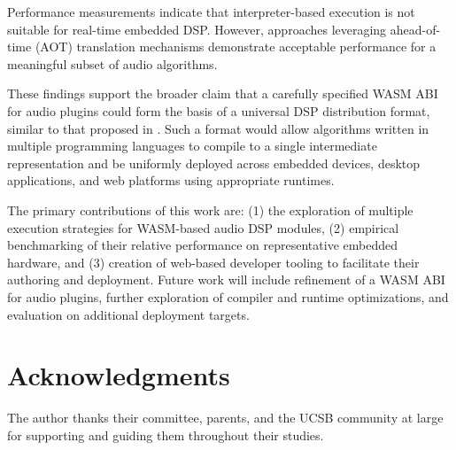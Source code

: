\documentclass[a4paper]{article}
\begin{document}
Performance measurements indicate that interpreter-based execution is not suitable for real-time embedded DSP. However, approaches leveraging ahead-of-time (AOT) translation mechanisms demonstrate acceptable performance for a meaningful subset of audio algorithms. 

These findings support the broader claim that a carefully specified WASM ABI for audio plugins could form the basis of a universal DSP distribution format, similar to that proposed in \cite{gaster2020audio}. Such a format would allow algorithms written in multiple programming languages to compile to a single intermediate representation and be uniformly deployed across embedded devices, desktop applications, and web platforms using appropriate runtimes.

The primary contributions of this work are: (1) the exploration of multiple execution strategies for WASM-based audio DSP modules, (2) empirical benchmarking of their relative performance on representative embedded hardware, and (3) creation of web-based developer tooling to facilitate their authoring and deployment. Future work will include refinement of a WASM ABI for audio plugins, further exploration of compiler and runtime optimizations, and evaluation on additional deployment targets.

\section{ Acknowledgments }

The author thanks their committee, parents, and the UCSB community at large for supporting and guiding them throughout their studies.



\end{document}
